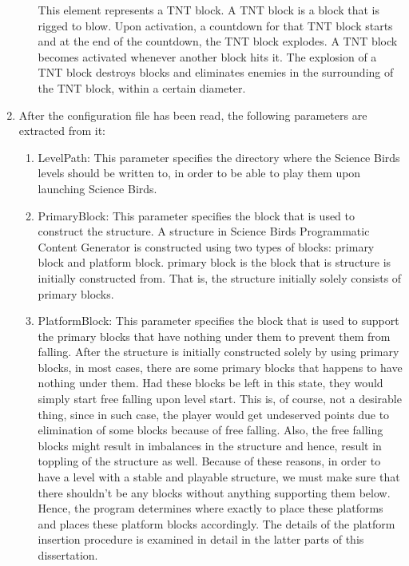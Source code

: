 \documentclass{dalthesis}
\begin{document}
\begin{enumerate}
\begin{enumerate}
    This element represents a TNT block. A TNT block is a block that is rigged to blow. Upon activation, a countdown for that TNT block starts and at the end of the countdown, the TNT block explodes. A TNT block becomes activated whenever another block hits it. The explosion of a TNT block destroys blocks and eliminates enemies in the surrounding of the TNT block, within a certain diameter.
  \end{enumerate}

  \item After the configuration file has been read, the following parameters are extracted from it:

  \begin{enumerate}
    \item LevelPath: This parameter specifies the directory where the Science Birds levels should be written to, in order to be able to play them upon launching Science Birds.

    \item PrimaryBlock: This parameter specifies the block that is used to construct the structure. A structure in Science Birds Programmatic Content Generator is constructed using two types of blocks: primary block and platform block. primary block is the block that is structure is initially constructed from. That is, the structure initially solely consists of primary blocks.

    \item PlatformBlock: This parameter specifies the block that is used to support the primary blocks that have nothing under them to prevent them from falling. After the structure is initially constructed solely by using primary blocks, in most cases, there are some primary blocks that happens to have nothing under them. Had these blocks be left in this state, they would simply start free falling upon level start. This is, of course, not a desirable thing, since in such case, the player would get undeserved points due to elimination of some blocks because of free falling. Also, the free falling blocks might result in imbalances in the structure and hence, result in toppling of the structure as well. Because of these reasons, in order to have a level with a stable and playable structure, we must make sure that there shouldn't be any blocks without anything supporting them below. Hence, the program determines where exactly to place these platforms and places these platform blocks accordingly. The details of the platform insertion procedure is examined in detail in the latter parts of this dissertation.


\end{enumerate}
\end{enumerate}
\end{document}
